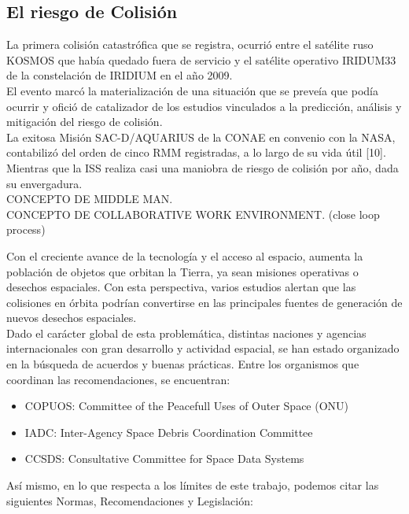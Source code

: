 \subsection*{El riesgo de Colisi\'on}
La primera colisi\'on catastr\'ofica que se registra, ocurri\'o entre el sat\'elite ruso KOSMOS  que hab\'ia quedado fuera de servicio y el sat\'elite operativo IRIDUM33 de la constelaci\'on de IRIDIUM en el a\~no 2009.\\
El evento marc\'o la materializaci\'on de una situaci\'on que se preve\'ia que pod\'ia ocurrir y ofici\'o de catalizador de los estudios vinculados a la predicci\'on, an\'alisis y mitigaci\'on del riesgo de colisi\'on.\\
La exitosa Misi\'on SAC-D/AQUARIUS de la CONAE en convenio con la \ac{NASA}, contabiliz\'o del orden de cinco RMM registradas, a lo largo de su vida \'util [10]. Mientras que la \ac{ISS} realiza casi una maniobra de riesgo de colisi\'on por año, dada su envergadura.\\
CONCEPTO DE MIDDLE MAN.\\
CONCEPTO DE COLLABORATIVE WORK ENVIRONMENT. (close loop process)

Con el creciente avance de la tecnolog\'ia y el acceso al espacio, aumenta la poblaci\'on de objetos que orbitan la Tierra, ya sean  misiones operativas o desechos espaciales. Con esta perspectiva, varios estudios alertan que las colisiones en \'orbita podr\'ian convertirse en las principales fuentes de generaci\'on de nuevos desechos espaciales. \cite{KlinkradChapter8}\\

Dado el car\'acter global de esta problem\'atica, distintas naciones y agencias internacionales con gran desarrollo y actividad espacial, se han estado organizado en la b\'usqueda de acuerdos y buenas pr\'acticas. Entre los organismos que coordinan las recomendaciones, se encuentran:\\

\begin{itemize}
\item {\small{COPUOS: Committee of the Peacefull Uses of Outer Space (ONU)}}
\item {\small{IADC: Inter-Agency Space Debris Coordination Committee}}
\item {\small{CCSDS: Consultative Committee for Space Data Systems}}
\end{itemize}

As\'i mismo, en lo que respecta a los l\'imites de este trabajo, podemos citar las siguientes Normas, Recomendaciones y Legislaci\'on:\\

